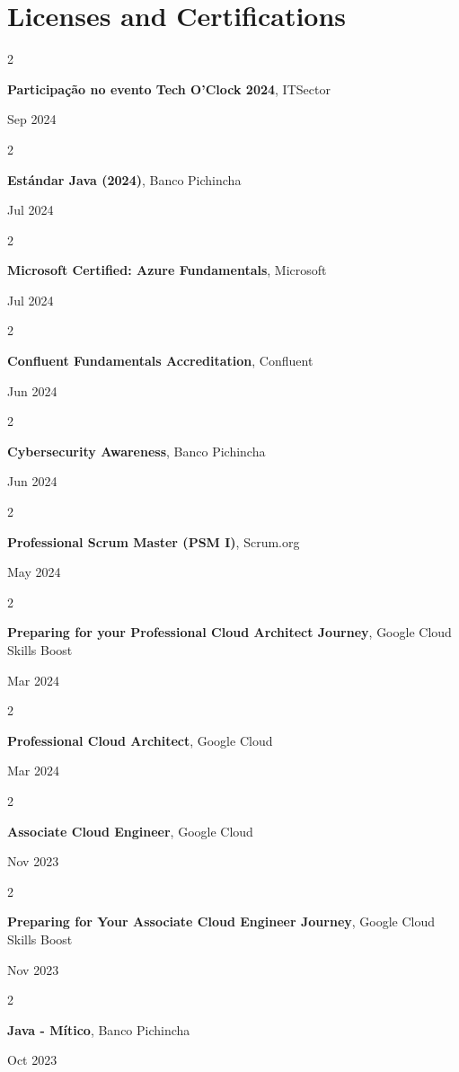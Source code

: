 \documentclass[10pt, letterpaper]{article}
\newenvironment{twocolentry}[2][]{
    \onecolentry
    \def\secondColumn{#2}
    \setcolumnwidth{\fill, 4.5 cm}
    \begin{paracol}{2}
}{
    \switchcolumn \raggedleft \secondColumn
    \end{paracol}
    \endonecolentry
} %
\begin{document}
    \section{Licenses and Certifications}
    \begin{twocolentry}{
        Sep 2024
    }
    \textbf{Participação no evento Tech O'Clock 2024}, ITSector
    \end{twocolentry}
    \begin{twocolentry}{
            Jul 2024
        }
        \textbf{Estándar Java (2024)}, Banco Pichincha
    \end{twocolentry}
    \begin{twocolentry}{
        Jul 2024
    }
    \textbf{Microsoft Certified: Azure Fundamentals}, Microsoft
    \end{twocolentry}
    \begin{twocolentry}{
            Jun 2024
        }
        \textbf{Confluent Fundamentals Accreditation}, Confluent
    \end{twocolentry}
    \begin{twocolentry}{
            Jun 2024
        }
        \textbf{Cybersecurity Awareness}, Banco Pichincha
    \end{twocolentry}
    \begin{twocolentry}{
            May 2024
        }
        \textbf{Professional Scrum Master (PSM I)}, Scrum.org
    \end{twocolentry}
    \begin{twocolentry}{
            Mar 2024
        }
        \textbf{Preparing for your Professional Cloud Architect Journey}, Google Cloud Skills Boost
    \end{twocolentry}
    \begin{twocolentry}{
            Mar 2024
        }
        \textbf{Professional Cloud Architect}, Google Cloud
    \end{twocolentry}
    \begin{twocolentry}{
            Nov 2023
        }
        \textbf{Associate Cloud Engineer}, Google Cloud
    \end{twocolentry}
    \begin{twocolentry}{
            Nov 2023
        }
        \textbf{Preparing for Your Associate Cloud Engineer Journey}, Google Cloud Skills Boost
    \end{twocolentry}
    \begin{twocolentry}{
            Oct 2023
        }
        \textbf{Java - Mítico}, Banco Pichincha
    \end{twocolentry}
\end{document}

